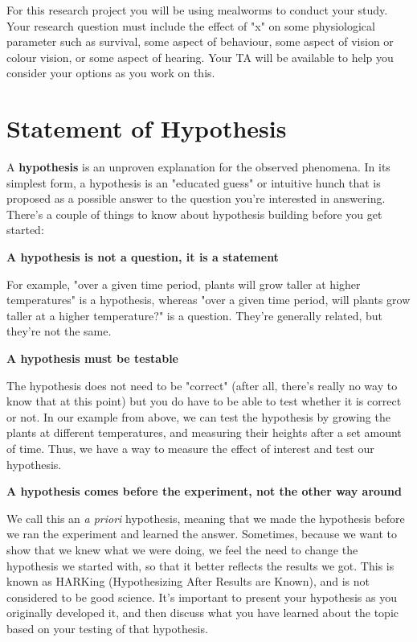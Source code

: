 \documentclass[
]{book}
\begin{document}
For this research project you will be using mealworms to conduct your study. Your research question must include the effect of "x" on some physiological parameter such as survival, some aspect of behaviour, some aspect of vision or colour vision, or some aspect of hearing. Your TA will be available to help you consider your options as you work on this.

\hypertarget{statement-of-hypothesis}{%
\section{Statement of Hypothesis}\label{statement-of-hypothesis}}

A \textbf{hypothesis} is an unproven explanation for the observed phenomena. In its simplest form, a hypothesis is an "educated guess" or intuitive hunch that is proposed as a possible answer to the question you're interested in answering. There's a couple of things to know about hypothesis building before you get started:

\textbf{A hypothesis is not a question, it is a statement}

For example, "over a given time period, plants will grow taller at higher temperatures" is a hypothesis, whereas "over a given time period, will plants grow taller at a higher temperature?" is a question. They're generally related, but they're not the same.

\textbf{A hypothesis must be testable}

The hypothesis does not need to be "correct" (after all, there's really no way to know that at this point) but you do have to be able to test whether it is correct or not. In our example from above, we can test the hypothesis by growing the plants at different temperatures, and measuring their heights after a set amount of time. Thus, we have a way to measure the effect of interest and test our hypothesis.

\textbf{A hypothesis comes before the experiment, not the other way around}

We call this an \emph{a priori} hypothesis, meaning that we made the hypothesis before we ran the experiment and learned the answer. Sometimes, because we want to show that we knew what we were doing, we feel the need to change the hypothesis we started with, so that it better reflects the results we got. This is known as HARKing (Hypothesizing After Results are Known), and is not considered to be good science. It's important to present your hypothesis as you originally developed it, and then discuss what you have learned about the topic based on your testing of that hypothesis.
\end{document}
